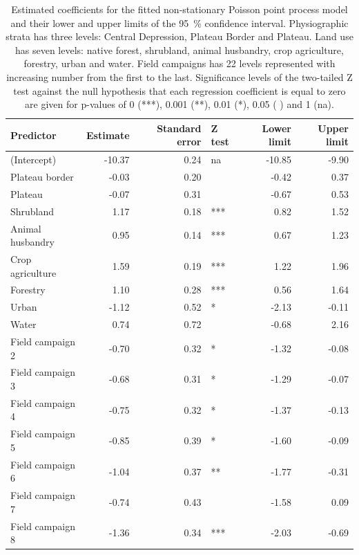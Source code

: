 \begin{table}[!ht]
 \caption{Estimated coefficients for the fitted non-stationary Poisson point process model and their lower and 
 upper limits of the \SI{95}{\percent} confidence interval. Physiographic strata has three levels: Central 
 Depression, Plateau Border and Plateau. Land use has seven levels: native forest, shrubland, animal 
 husbandry, crop agriculture, forestry, urban and water. Field campaigns has \num{22} levels represented with 
 increasing number from the first to the last. Significance levels of the two-tailed Z test against the null 
 hypothesis that each regression coefficient is equal to zero are given for p-values of \num{0} (***), 
 \num{0.001} (**), \num{0.01} (*), \num{0.05} ( ) and \num{1} (na).}
 \label{tab:coef}
 \centering\footnotesize
 \begin{tabular}{lrrlrr}
  \hline
  Predictor		& Estimate 	& Standard error	& Z test & Lower limit 	& Upper limit	\\ 
  \hline
  (Intercept)		& -10.37 	& 0.24 			& na 	& -10.85	& -9.90         \\ 
  Plateau border	& -0.03 	& 0.20 			&    	& -0.42 	& 0.37	\\ 
  Plateau		& -0.07 	& 0.31 			&    	& -0.67 	& 0.53 	\\ 
  Shrubland		& 1.17 		& 0.18 			& *** 	& 0.82 	        & 1.52 	\\ 
  Animal husbandry	& 0.95 		& 0.14 			& *** 	& 0.67 		& 1.23 	\\ 
  Crop agriculture	& 1.59 		& 0.19 			& *** 	& 1.22 		& 1.96 	\\ 
  Forestry		& 1.10 		& 0.28 			& *** 	& 0.56 		& 1.64 	\\ 
  Urban			& -1.12 	& 0.52 			& * 	& -2.13 	& -0.11 \\ 
  Water			& 0.74 		& 0.72 			&    	& -0.68 	& 2.16 	\\ 
  Field campaign 2	& -0.70 	& 0.32 			& * 	& -1.32 	& -0.08\\ 
  Field campaign 3	& -0.68 	& 0.31 			& * 	& -1.29 	& -0.07\\ 
  Field campaign 4	& -0.75 	& 0.32 			& * 	& -1.37 	& -0.13\\ 
  Field campaign 5	& -0.85 	& 0.39 			& * 	& -1.60 	& -0.09 \\ 
  Field campaign 6	& -1.04 	& 0.37 			& **	& -1.77 	& -0.31 \\ 
  Field campaign 7	& -0.74 	& 0.43 			&    	& -1.58 	& 0.09 	\\ 
  Field campaign 8	& -1.36 	& 0.34 			& *** 	& -2.03 	& -0.69 \\ 

\end{tabular}
\end{table}

